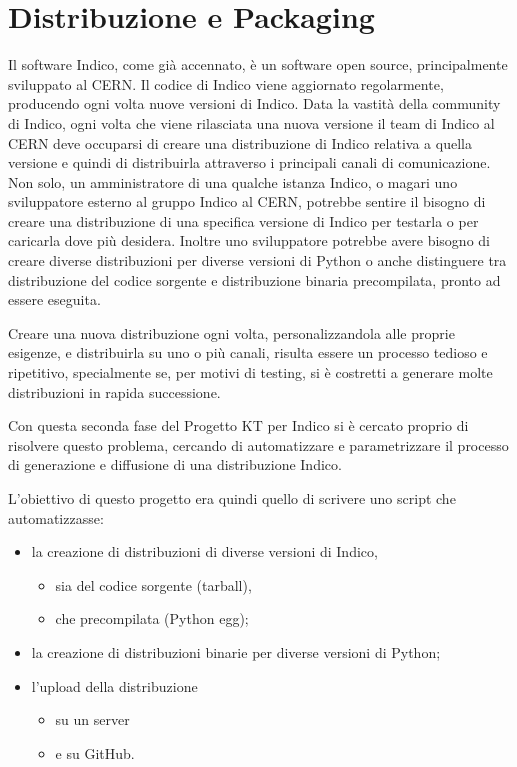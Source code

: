 \chapter{Distribuzione e Packaging} \label{chap:distribuzione_packaging}

    Il software Indico, come già accennato, è un software open source, principalmente sviluppato al \ac{CERN}. Il codice di Indico viene aggiornato regolarmente, producendo ogni volta nuove versioni di Indico. Data la vastità della community di Indico, ogni volta che viene rilasciata una nuova versione il team di Indico al \ac{CERN} deve occuparsi di creare una distribuzione di Indico relativa a quella versione e quindi di distribuirla attraverso i principali canali di comunicazione. Non solo, un amministratore di una qualche istanza Indico, o magari uno sviluppatore esterno al gruppo Indico al \ac{CERN}, potrebbe sentire il bisogno di creare una distribuzione di una specifica versione di Indico per testarla o per caricarla dove più desidera. Inoltre uno sviluppatore potrebbe avere bisogno di creare diverse distribuzioni per diverse versioni di Python o anche distinguere tra distribuzione del codice sorgente e distribuzione binaria precompilata, pronto ad essere eseguita.
    
    Creare una nuova distribuzione ogni volta, personalizzandola alle proprie esigenze, e distribuirla su uno o più canali, risulta essere un processo tedioso e ripetitivo, specialmente se, per motivi di testing, si è costretti a generare molte distribuzioni in rapida successione.
    
    Con questa seconda fase del Progetto KT per Indico si è cercato proprio di risolvere questo problema, cercando di automatizzare e parametrizzare il processo di generazione e diffusione di una distribuzione Indico.
    
    L'obiettivo di questo progetto era quindi quello di scrivere uno script che automatizzasse:
    
    \begin{itemize}
        \item la creazione di distribuzioni di diverse versioni di Indico,
        \begin{itemize}
            \item sia del codice sorgente (tarball),
            \item che precompilata (Python egg);
        \end{itemize}
        \item la creazione di distribuzioni binarie per diverse versioni di Python;
        \item l'upload della distribuzione
        \begin{itemize}
            \item su un server
            \item e su GitHub.
        \end{itemize}
    \end{itemize}
    
